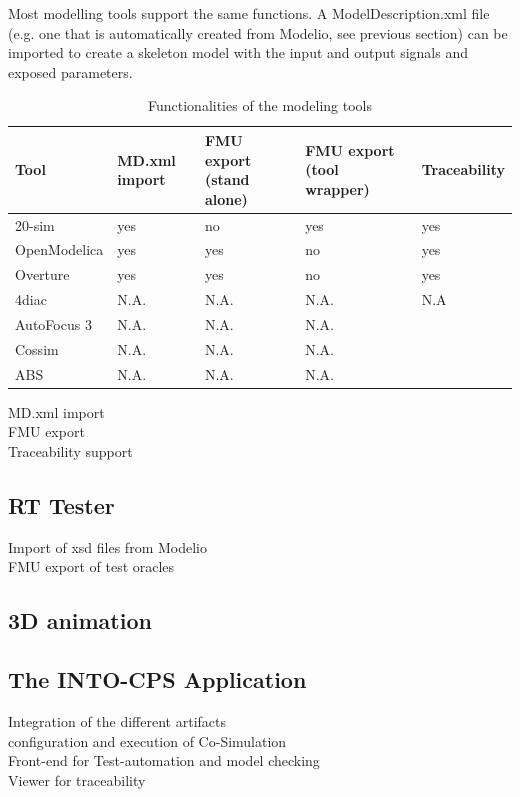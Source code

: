 Most modelling tools support the same functions. A ModelDescription.xml file (e.g. one that is automatically created from Modelio, see previous section) can be imported to create a skeleton model with the input and output signals and exposed parameters. 


\begin{table}[ht]
	\centering
		\begin{tabular}{l|p{3cm}|p{3cm}|p{3cm}|p{3cm}}
			Tool & MD.xml import & FMU export (stand alone) & FMU export (tool wrapper) & Traceability\\
			\hline
			20-sim & yes & no & yes & yes\\
			OpenModelica & yes & yes & no & yes\\
			Overture & yes & yes & no & yes\\
			4diac & N.A. & N.A. & N.A. & N.A \\
			AutoFocus 3 & N.A. & N.A. & N.A. \\
			Cossim & N.A. & N.A. & N.A. \\
			ABS & N.A. & N.A. & N.A. \\
		\end{tabular}
	\caption{Functionalities of the modeling tools}
	\label{tab:FunctionalitiesOfTheModelingTools}
\end{table}

MD.xml import\\
FMU export\\
Traceability support\\

\subsection{RT Tester}

Import of xsd files from Modelio\\
FMU export of test oracles \\

\subsection{3D animation}

\subsection{The INTO-CPS Application}

Integration of the different artifacts\\ 
configuration and execution of Co-Simulation\\
Front-end for Test-automation and model checking\\
Viewer for traceability\\
